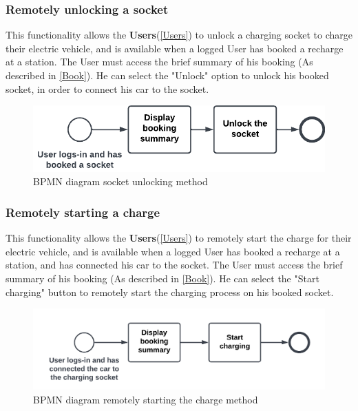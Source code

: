 \subsubsection{Remotely unlocking a socket}
This functionality allows the \textbf{Users}(\ref{Users}) to unlock a charging socket to charge their electric vehicle, and is available when a logged User has booked a recharge at a station. 
The User must access the brief summary of his booking (As described in \ref{Book}).
He can select the "Unlock" option to unlock his booked socket, in order to connect his car to the socket.
\begin{figure}[H]
    \begin{center}
        \includegraphics[scale=0.3]{img/fun-sock-unl.png}
        \caption{BPMN diagram socket unlocking method}
    \end{center}
\end{figure}
\subsubsection{Remotely starting a charge}
This functionality allows the \textbf{Users}(\ref{Users}) to remotely start the charge for their electric vehicle, and is available when a logged User has booked a recharge at a station, and has connected his car to the socket. 
The User must access the brief summary of his booking (As described in \ref{Book}).
He can select the "Start charging" button to remotely start the charging process on his booked socket.
\begin{figure}[H]
    \begin{center}
        \includegraphics[scale=0.2]{img/fun-rem-ch.png}
        \caption{BPMN diagram remotely starting the charge method}
    \end{center}
\end{figure}
